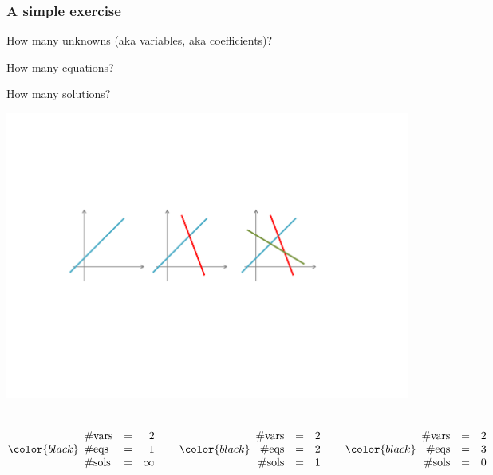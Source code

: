 \documentclass[compress]{beamer}
\newcommand{\black}[1]{{\color{black}#1}}
\newcommand{\beq}[1]{\[\black{#1}\]}
\begin{document}

\begin{frame}
\frametitle{A simple exercise}

How many \black{unknowns} (aka variables, aka coefficients)?

\vspace{.2cm}

How many \black{equations}?

\vspace{.2cm}

How many \black{solutions}?

\begin{center}
\includegraphics[trim = 40mm 90mm 65mm 60mm, clip, width=\textwidth]{./img/eqs-geometry-1}
\end{center}

\begin{columns}
\beq{
\begin{array}{lrr}
\textrm{\#vars} &=& 2\\
\textrm{\#eqs} &=& 1\\
\textrm{\#sols} &=& \infty\\
\end{array}
}

\beq{
\begin{array}{rrr}
\textrm{\#vars} &=& 2\\
\textrm{\#eqs} &=& 2\\
\textrm{\#sols} &=& 1\\
\end{array}
}

\beq{
\begin{array}{rrr}
\textrm{\#vars} &=& 2\\
\textrm{\#eqs} &=& 3\\
\textrm{\#sols} &=& 0\\
\end{array}
}
\end{columns}

\end{frame}
\end{document}

